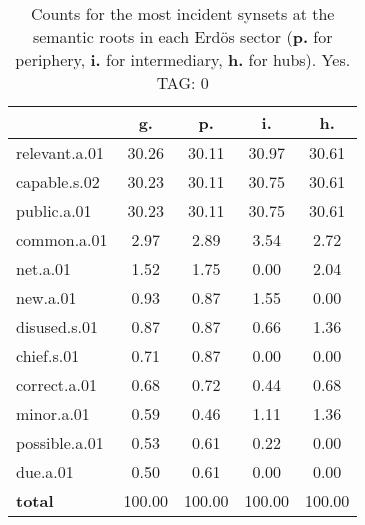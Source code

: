 \begin{table}[h!]
\begin{center}
\begin{tabular}{| l || c | c | c | c |}\hline
 & {\bf g.} & {\bf p.} & {\bf i.} & {\bf h.} \\\hline\hline
relevant.a.01 & 30.26  & 30.11  & 30.97  & 30.61 \\\hline
capable.s.02 & 30.23  & 30.11  & 30.75  & 30.61 \\\hline
public.a.01 & 30.23  & 30.11  & 30.75  & 30.61 \\\hline
common.a.01 & 2.97  & 2.89  & 3.54  & 2.72 \\\hline
net.a.01 & 1.52  & 1.75  & 0.00  & 2.04 \\\hline
new.a.01 & 0.93  & 0.87  & 1.55  & 0.00 \\\hline
disused.s.01 & 0.87  & 0.87  & 0.66  & 1.36 \\\hline
chief.s.01 & 0.71  & 0.87  & 0.00  & 0.00 \\\hline
correct.a.01 & 0.68  & 0.72  & 0.44  & 0.68 \\\hline
minor.a.01 & 0.59  & 0.46  & 1.11  & 1.36 \\\hline
possible.a.01 & 0.53  & 0.61  & 0.22  & 0.00 \\\hline
due.a.01 & 0.50  & 0.61  & 0.00  & 0.00 \\\hline\hline
{{\bf total}} & 100.00  & 100.00  & 100.00  & 100.00 \\\hline
\end{tabular}
\caption{Counts for the most incident synsets at the semantic roots in each Erd\"os sector ({\bf p.} for periphery, {\bf i.} for intermediary, {\bf h.} for hubs). Yes. TAG: 0}
\end{center}
\end{table}